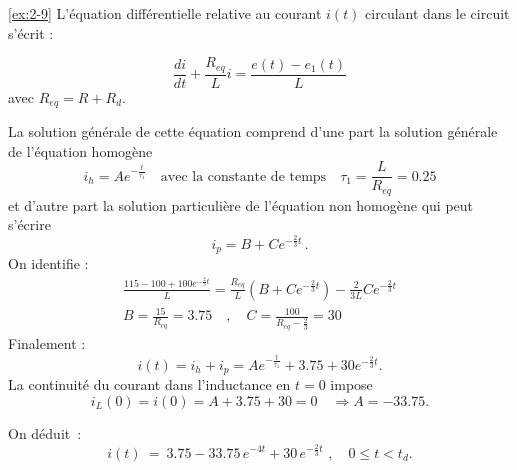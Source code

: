 \begin{solexercise}{\ref{ex:2-9}}
L'\'equation diff\'erentielle relative au courant $i(t)$ circulant dans le circuit s'\'ecrit :

\[\frac{di}{dt}+\frac{R_{eq}}{L}i=\frac{e(t)-e_1(t)}{L}\]
avec $R_{eq}=R+R_d$.

La solution g\'en\'erale de cette \'equation comprend d'une part la solution g\'en\'erale de l'\'equation homog\`ene
\[i_h=Ae^{-\frac{t}{\tau_1}}\quad \text{avec la constante de temps} \quad \tau_1=\frac{L}{R_{eq}}=0.25\]
et d'autre part la solution particuli\`ere de l'\'equation non homog\`ene qui peut s'\'ecrire
\[i_p=B+Ce^{-\frac{2}{3}t} \, .\]
On identifie :
\begin{align*}
\frac{115-100+100e^{-\frac{2}{3}t}}{L}=\frac{R_{eq}}{L}(B+Ce^{-\frac{2}{3}t})-\frac{2}{3L}Ce^{-\frac{2}{3}t}\\
B=\frac{15}{R_{eq}}=3.75  \quad , \quad C=\frac{100}{R_{eq}-\frac{2}{3}}=30
\end{align*}
Finalement :
\[i(t)=i_h+i_p=Ae^{-\frac{t}{\tau_1}}+3.75 +30e^{-\frac{2}{3}t}.\]
La continuit\'e du courant dans l'inductance en $t=0$ impose
\[i_L(0)=i(0)=A+3.75 +30=0 \quad \Rightarrow A=-33.75.\]


On d\'eduit~:
\[ i(t) \: = \: 3.75 - 33.75 \, e^{-4t} + 30 \, e^{-\frac{2}{3} t} \,\,
, \quad 0\leq t < t_d.\]


\end{solexercise}
